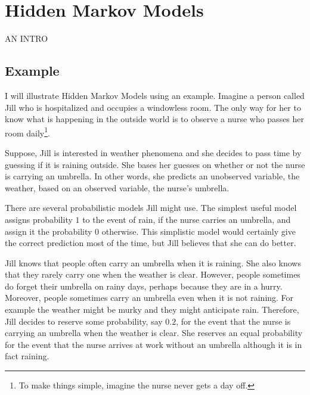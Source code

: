 \chapter{Hidden Markov Models}
\label{chapter:hmm}

AN INTRO

\section{Example}

I will illustrate Hidden Markov Models using an example. Imagine a
person called Jill who is hospitalized and occupies a windowless
room. The only way for her to know what is happening in the outside
world is to observe a nurse who passes her room daily\footnote{To make things simple, imagine the nurse never gets a day
  off.}.

Suppose, Jill is interested in weather phenomena and she decides to
pass time by guessing if it is raining outside. She bases her guesses
on whether or not the nurse is carrying an umbrella. In other words,
she predicts an unobserved variable, the weather, based on an observed
variable, the nurse's umbrella.

There are several probabilistic models Jill might use. The simplest
useful model assigns probability $1$ to the event of rain, if the
nurse carries an umbrella, and assign it the probability $0$
otherwise. This simplistic model would certainly give the correct
prediction most of the time, but Jill believes that she can do better.

Jill knows that people often carry an umbrella when it is raining. She
also knows that they rarely carry one when the weather is
clear. However, people sometimes do forget their umbrella on
rainy days, perhaps because they are in a hurry. Moreover, people
sometimes carry an umbrella even when it is not raining. For example
the weather might be murky and they might anticipate rain. Therefore,
Jill decides to reserve some probability, say $0.2$, for the event
that the nurse is carrying an umbrella when the weather is clear. She
reserves an equal probability for the event that the nurse arrives at
work without an umbrella although it is in fact raining.
 
